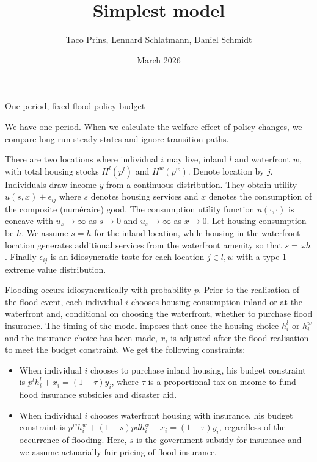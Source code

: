 \documentclass{article}
\title{Simplest model}
\author{Taco Prins, Lennard Schlatmann, Daniel Schmidt}
\date{March 2026}
\begin{document}
\maketitle

\begin{section}{One period, fixed flood policy budget}

We have one period. When we calculate the welfare effect of policy changes, we compare long-run steady states and ignore transition paths. 

\vspace{\baselineskip}

There are two locations where individual $i$ may live, inland $l$ and waterfront $w$, with total housing stocks $H^l(p^l)$ and $H^w(p^w)$. Denote location by $j$. Individuals draw income $y$ from a continuous distribution. They obtain utility $u(s,x)+\epsilon_{ij}$ where $s$ denotes housing services and $x$ denotes the consumption of the composite (numéraire) good. The consumption utility function $u(\cdot,\cdot)$ is concave with $u_s\rightarrow\infty$ as $s\rightarrow0$ and $u_x\rightarrow\infty$ as $x\rightarrow0$. Let housing consumption be $h$. We assume $s=h$ for the inland location, while housing in the waterfront location generates additional services from the waterfront amenity so that $s=\omega h$. Finally $\epsilon_{ij}$ is an idiosyncratic taste for each location $j\in{l,w}$ with a type $1$ extreme value distribution.

\vspace{\baselineskip}

Flooding occurs idiosyncratically with probability $p$. Prior to the realisation of the flood event, each individual $i$ chooses housing consumption inland or at the waterfront and, conditional on choosing the waterfront, whether to purchase flood insurance. The timing of the model imposes that once the housing choice $h^l_i$ or $h^w_i$ and the insurance choice has been made, $x_i$ is adjusted after the flood realisation to meet the budget constraint.  We get the following constraints:

\begin{itemize}

\item When individual $i$ chooses to purchase inland housing, his budget constraint is $p^lh^l_i+x_i=(1-\tau)y_i$, where $\tau$ is a proportional tax on income to fund flood insurance subsidies and disaster aid. 

\item When individual $i$ chooses waterfront housing with insurance, his budget constraint is $p^wh^w_i+(1-s)pdh^w_i+x_i=(1-\tau)y_i$, regardless of the occurrence of flooding. Here, $s$ is the government subsidy for insurance and we assume actuarially fair pricing of flood insurance. 


\end{itemize}
\end{section}
\end{document}
